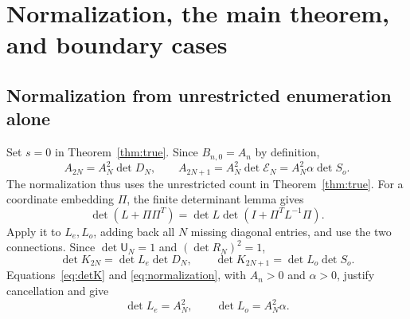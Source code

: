 \documentclass[11pt,a4paper]{amsart}
\theoremstyle{remark}\newtheorem{remark}[theorem]{Remark}
\numberwithin{equation}{section}
\newcommand{\U}{\mathsf U}
\newcommand{\EE}{\mathcal E}
\begin{document}
\section{Normalization, the main theorem, and boundary cases}\label{sec:closure}
\subsection{Normalization from unrestricted enumeration alone}
Set $s=0$ in Theorem~\ref{thm:true}. Since $B_{n,0}=A_n$ by definition,
\begin{equation}\label{eq:normalization}
 A_{2N}=A_N^2\det D_N,\qquad
 A_{2N+1}=A_N^2\det\EE_N=A_N^2\alpha\det S_o.
\end{equation}
The normalization thus uses the unrestricted count in Theorem~\ref{thm:true}.
For a coordinate embedding $\Pi$, the finite determinant lemma gives
\begin{equation}\label{eq:det-add}
 \det(L+\Pi\Pi^T)=\det L\det(I+\Pi^TL^{-1}\Pi).
\end{equation}
Apply it to $L_e,L_o$, adding back all $N$ missing diagonal entries, and use the two connections. Since $\det\U_N=1$ and $(\det R_N)^2=1$,
\[
 \det K_{2N}=\det L_e\det D_N,\qquad
 \det K_{2N+1}=\det L_o\det S_o.
\]
Equations~\eqref{eq:detK} and \eqref{eq:normalization}, with $A_n>0$ and $\alpha>0$, justify cancellation and give
\begin{equation}\label{eq:base-det}
 \det L_e=A_N^2,\qquad \det L_o=A_N^2\alpha.
\end{equation}
\end{document}
